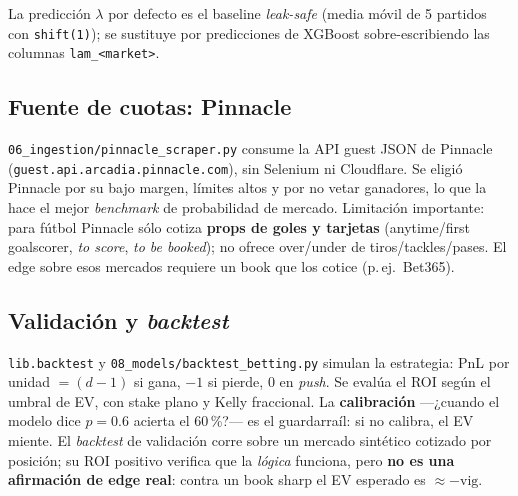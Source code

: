 La predicción $\lambda$ por defecto es el baseline \emph{leak-safe}
(media móvil de 5 partidos con \texttt{shift(1)}); se sustituye por predicciones de
XGBoost sobre-escribiendo las columnas \texttt{lam\_<market>}.

\subsection{Fuente de cuotas: Pinnacle}

\texttt{06\_ingestion/pinnacle\_scraper.py} consume la API guest JSON de Pinnacle
(\texttt{guest.api.arcadia.pinnacle.com}), sin Selenium ni Cloudflare. Se eligió
Pinnacle por su bajo margen, límites altos y por no vetar ganadores, lo que la
hace el mejor \emph{benchmark} de probabilidad de mercado. Limitación importante:
para fútbol Pinnacle sólo cotiza \textbf{props de goles y tarjetas} (anytime/first
goalscorer, \emph{to score}, \emph{to be booked}); no ofrece over/under de
tiros/tackles/pases. El edge sobre esos mercados requiere un book que los cotice
(p.\,ej.\ Bet365).

\subsection{Validación y \emph{backtest}}

\texttt{lib.backtest} y \texttt{08\_models/backtest\_betting.py} simulan la
estrategia: PnL por unidad $= (d-1)$ si gana, $-1$ si pierde, $0$ en \emph{push}.
Se evalúa el ROI según el umbral de EV, con stake plano y Kelly fraccional. La
\textbf{calibración} —¿cuando el modelo dice $p=0.6$ acierta el 60\,\%?— es el
guardarraíl: si no calibra, el EV miente. El \emph{backtest} de validación corre
sobre un mercado sintético cotizado por posición; su ROI positivo verifica que la
\emph{lógica} funciona, pero \textbf{no es una afirmación de edge real}: contra un
book sharp el EV esperado es $\approx -\text{vig}$.
